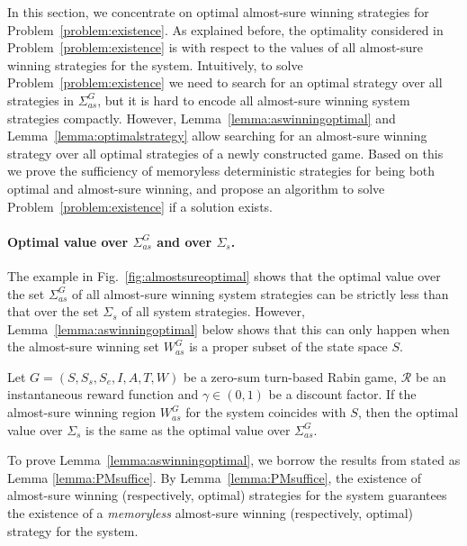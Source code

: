 \documentclass[runningheads,a4paper]{llncs}
\begin{document}
In this section, we concentrate on optimal almost-sure winning strategies for Problem~\ref{problem:existence}. 
As explained before, the optimality considered in Problem~\ref{problem:existence} is with respect to the values of all almost-sure winning strategies for the system. Intuitively, to solve Problem~\ref{problem:existence} we need to search for an optimal strategy over all strategies in $\Sigma_{as}^G$, but it is hard to encode all almost-sure winning system strategies compactly. However, Lemma~\ref{lemma:aswinningoptimal} and Lemma~\ref{lemma:optimalstrategy} allow searching for an almost-sure winning strategy over all optimal strategies of a newly constructed game. 
Based on this we prove the sufficiency of memoryless deterministic strategies for being both optimal and almost-sure winning, and propose an algorithm to solve Problem~\ref{problem:existence} if a solution exists. 





\paragraph{Optimal value over $\Sigma_{as}^G$ and over $\Sigma_s$.}
The example in Fig.~\ref{fig:almostsureoptimal} shows that the optimal value over the set $\Sigma_{as}^G$ of all almost-sure winning system strategies can be strictly less than that over the set $\Sigma_s$ of all system strategies. However, Lemma~\ref{lemma:aswinningoptimal} below shows that this can only happen when the almost-sure winning set $W_{as}^G$ is a proper subset of the state space $S$.

\begin{lemma}
Let $G = (S, S_s, S_e, I, A, T, W)$ be a zero-sum turn-based Rabin game, $\mathcal{R}$ be an instantaneous reward function and $\gamma \in (0,1)$ be a discount factor. 
If the almost-sure winning region $W_{as}^{G}$ for the system coincides with $S$, then the optimal value over $\Sigma_s$ is the same as the optimal value over $\Sigma_{as}^G$. 
\label{lemma:aswinningoptimal}
\end{lemma}



To prove Lemma~\ref{lemma:aswinningoptimal}, we borrow the results from \cite{chatterjee2005complexity, filar1996competitive} stated as Lemma \ref{lemma:PMsuffice}. 
By Lemma~\ref{lemma:PMsuffice}, the existence of almost-sure winning (respectively, optimal) strategies for the system guarantees the existence of a \emph{memoryless} almost-sure winning (respectively, optimal) strategy for the system. 
\end{document}
